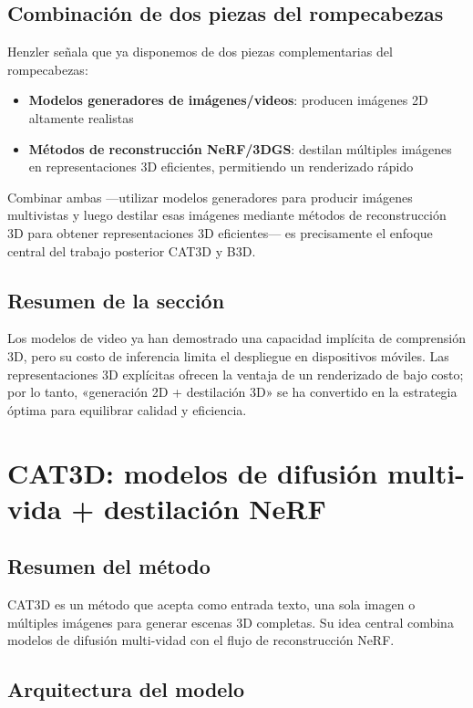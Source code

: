 \documentclass[a4paper]{article}
\begin{document}
\subsection{Combinación de dos piezas del rompecabezas}

Henzler señala que ya disponemos de dos piezas complementarias del rompecabezas:

\begin{itemize}
    \item \textbf{Modelos generadores de imágenes/videos}: producen imágenes 2D altamente realistas
    \item \textbf{Métodos de reconstrucción NeRF/3DGS}: destilan múltiples imágenes en representaciones 3D eficientes, permitiendo un renderizado rápido
\end{itemize}

Combinar ambas —utilizar modelos generadores para producir imágenes multivistas y luego destilar esas imágenes mediante métodos de reconstrucción 3D para obtener representaciones 3D eficientes— es precisamente el enfoque central del trabajo posterior CAT3D y B3D.

\subsection{Resumen de la sección}

Los modelos de video ya han demostrado una capacidad implícita de comprensión 3D, pero su costo de inferencia limita el despliegue en dispositivos móviles. Las representaciones 3D explícitas ofrecen la ventaja de un renderizado de bajo costo; por lo tanto, «generación 2D + destilación 3D» se ha convertido en la estrategia óptima para equilibrar calidad y eficiencia.
\section{CAT3D: modelos de difusión multi-vida + destilación NeRF}

\subsection{Resumen del método}

CAT3D es un método que acepta como entrada texto, una sola imagen o múltiples imágenes para generar escenas 3D completas. Su idea central combina modelos de difusión multi-vidad con el flujo de reconstrucción NeRF.

\subsection{Arquitectura del modelo}
\end{document}
